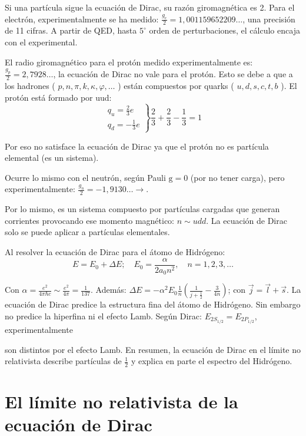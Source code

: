Si una partícula sigue la ecuación de Dirac, su razón giromagnética es 2. Para el electrón, experimentalmente se ha medido: $\frac{g_{e}}{2}=1,001159652209 \ldots$, una precisión de 11 cifras. A partir de QED, hasta $5^{\circ}$ orden de perturbaciones, el cálculo encaja con el experimental.

El radio giromagnético para el protón medido experimentalmente es: $\frac{g_{p}}{2}=2,7928 \ldots$, la ecuación de Dirac no vale para el protón. Esto se debe a que a los hadrones ( $p, n, \pi, k, \kappa, \varphi, \ldots$ ) están compuestos por quarks ( $u, d, s, c, t, b$ ). El protón está formado por uud:
$$
\left.\begin{array}{l}
q_{u}=\frac{2}{3} e \\
q_{d}=-\frac{1}{3} e
\end{array}\right\} \frac{2}{3}+\frac{2}{3}-\frac{1}{3}=1
$$

Por eso no satisface la ecuación de Dirac ya que el protón no es partícula elemental (es un sistema).

Ocurre lo mismo con el neutrón, según Pauli $\mathrm{g}=0$ (por no tener carga), pero experimentalmente: $\frac{g_{n}}{2}=-1,9130 \ldots \rightarrow$.

Por lo mismo, es un sistema compuesto por partículas cargadas que generan corrientes provocando ese momento magnético: $n \sim u d d$. La ecuación de Dirac solo se puede aplicar a partículas elementales.

Al resolver la ecuación de Dirac para el átomo de Hidrógeno:
$$
E=E_{0}+\Delta E ; \quad E_{0}=\frac{\alpha}{2 a_{0} n^{2}}, \quad n=1,2,3, \ldots
$$

Con $\alpha=\frac{e^{2}}{4 \pi \hbar c} \sim \frac{e^{2}}{4 \pi}=\frac{1}{137}$. Además: $\Delta E=-\alpha^{2} E_{0} \frac{1}{n}\left(\frac{1}{j+\frac{1}{2}}-\frac{3}{4 n}\right)$; con $\vec{j}=\vec{l}+\vec{s}$.
La ecuación de Dirac predice la estructura fina  del átomo de Hidrógeno. Sin embargo no predice la hiperfina ni el efecto Lamb. Según Dirac: $E_{2 S_{1 / 2}}=E_{2 P_{1 / 2}}$, experimentalmente


son distintos por el efecto Lamb.
En resumen, la ecuación de Dirac en el límite no relativista describe partículas de $\frac{1}{2}$ y explica en parte el espectro del Hidrógeno.
\section{El límite no relativista de la ecuación de Dirac}

